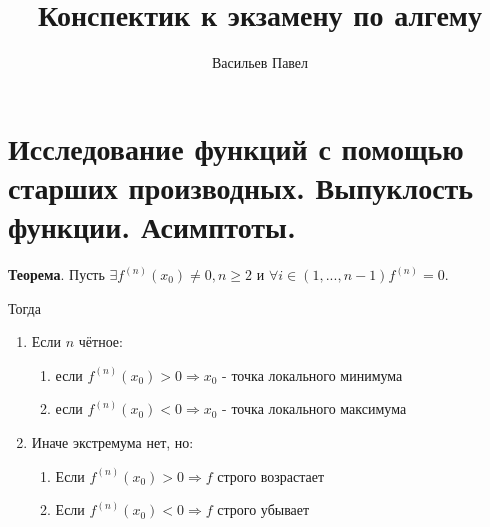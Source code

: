 \documentclass[a4paper]{article}
\title{Конспектик к экзамену по алгему}
\author{Васильев Павел}
\begin{document}
\section*{Исследование функций с помощью старших производных. Выпуклость функции. Асимптоты.}


\begin{htheorem}
	\textbf{Теорема}. Пусть $\exists f^{(n)} (x_0) \neq 0, n \geq 2$ и $\forall i \in (1, ..., n-1) f ^{(n)} = 0$.
	
	Тогда 
	\begin{enumerate}
	\item Если $n$ чётное:
		\begin{enumerate}
		\item если $f^{(n)} (x_0)>0 \Rightarrow x_0$ - точка локального минимума
		\item если $f^{(n)} (x_0)<0 \Rightarrow x_0$ - точка локального максимума
		\end{enumerate}

	
	\item Иначе экстремума нет, но:
	\begin{enumerate}
	\item Если $f^{(n)} (x_0)>0 \Rightarrow f$ строго возрастает
	\item Если $f^{(n)} (x_0)<0 \Rightarrow f$ строго убывает
	\end{enumerate}
		\end{enumerate}
\end{htheorem}
\end{document}
